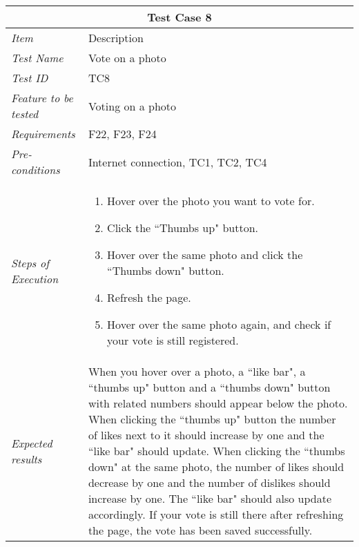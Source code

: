 %
\begin{minipage}{\linewidth}
\setlength{\tabcolsep}{15pt}
\centering
{}
\begin{tabular}{ |l|p{70mm}| }
	\hline
	\multicolumn{2}{|c|}{\cellcolor{gray!25} \textbf{Test Case 8}} \\
	\hline
	\it{\cellcolor{gray!25}Item} & {\cellcolor{gray!25} Description } \\
	\hline
	\it{\cellcolor{gray!25}Test Name } & Vote on a photo \\ \hline
	\it{\cellcolor{gray!25}Test ID} & TC8 \\ \hline
	\it{\cellcolor{gray!25}Feature to be tested} & Voting on a photo \\ \hline
	\it{\cellcolor{gray!25}Requirements} & F22, F23, F24  \\ \hline
	\it{\cellcolor{gray!25}Pre-conditions} & Internet connection, TC1, TC2, TC4  \\ \hline
	\it{\cellcolor{gray!25}Steps of Execution} & \begin{enumerate}
	                                       \item Hover over the photo you want to vote for.
	                                       \item Click the ``Thumbs up" button.
	                                       \item Hover over the same photo and click the ``Thumbs down" button.
	                                       \item Refresh the page.
	                                       \item Hover over the same photo again, and check if your vote is still registered.
	                                     \end{enumerate} \\ \hline
	\it{\cellcolor{gray!25}Expected results} & When you hover over a photo, a ``like bar", a ``thumbs up" button and a ``thumbs down" button with related numbers should appear below the photo. When clicking the ``thumbs up" button the number of likes next to it should increase by one and the ``like bar" should update. When clicking the ``thumbs down" at the same photo, the number of likes should decrease by one and the number of dislikes should increase by one. The ``like bar" should also update accordingly. If your vote is still there after refreshing the page, the vote has been saved successfully. \\
	\hline
\end{tabular}
\medskip
\end{minipage}
